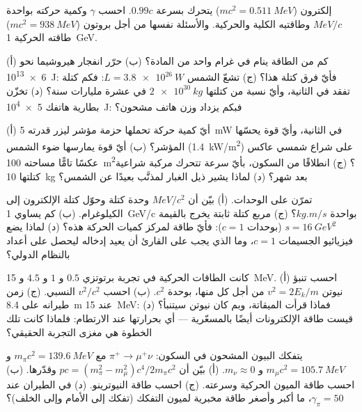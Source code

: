 \begin{exercise}[$\star$]\label{exo:b3:relativistic-dynamics:1}
إلكترون ($mc^2 = \qty{0.511}{MeV}$) يتحرك بسرعة $0.99c$. احسب
$\gamma$ وكمية حركته بواحدة $\unit{MeV}/c$ وطاقتيه الكلية
والحركية. والأسئلة نفسها من أجل بروتون ($mc^2 = \qty{938}{MeV}$)
طاقته الحركية \qty{1}{GeV}.
\end{exercise}

\begin{exercise}[$\star$]\label{exo:b3:relativistic-dynamics:2}
(أ) كم من الطاقة ينام في غرام واحد من المادة؟ (ب) حرّر انفجار
هيروشيما نحو \qty{6e13}{J}: فأيّ فرق كتلة هذا؟
(ج) تشعّ الشمس $L = \qty{3.8e26}{W}$: فكم كتلة تفقد
في الثانية، وأيّ نسبة من كتلتها $\qty{2e30}{kg}$ في عشرة
مليارات سنة؟ (د) تخزّن بطارية هاتفك \qty{5e4}{J}: فبكم
يزداد وزن هاتف مشحون؟
\end{exercise}

\begin{exercise}[$\star$]\label{exo:b3:relativistic-dynamics:3}
(أ) أيّ كمية حركة تحملها حزمة مؤشر ليزر قدرته \qty{5}{mW} في
الثانية، وأيّ قوة يحسّها المؤشر؟ (ب) أيّ قوة يمارسها
ضوء الشمس (\qty{1.4}{kW/m^2}) على شراع شمسي عاكس عكسًا تامًّا
مساحته \qty{100}{m^2}؟ (ج) انطلاقًا من السكون، بأيّ سرعة تتحرك
مركبة شراعية كتلتها \qty{10}{kg} بعد شهر؟ (د) لماذا يشير ذيل
الغبار لمذنَّب بعيدًا عن الشمس؟
\end{exercise}

\begin{exercise}[$\star$]\label{exo:b3:relativistic-dynamics:4}
تمرّن على الوحدات. (أ) بيّن أن $\unit{MeV}/c^2$ وحدة كتلة
وحوّل كتلة الإلكترون إلى الكيلوغرام. (ب) كم يساوي
\qty{1}{GeV/c} بواحدة $\unit{kg.m/s}$؟ (ج) مربع كتلة ثابتة
يخرج بالقيمة $s = \qty{16}{GeV^2}$ (بوحدات $c = 1$): فأيّ
طاقة لمركز كميات الحركة هذه؟ (د) لماذا يضع فيزيائيو الجسيمات
$c = 1$، وما الذي يجب على القارئ أن يعيد إدخاله ليحصل على أعداد بالنظام الدولي؟
\end{exercise}

\begin{exercise}[$\star\star$]\label{exo:b3:relativistic-dynamics:5}
كانت الطاقات الحركية في تجربة برتوتزي $0.5$ و $1$ و $4.5$ و
\qty{15}{MeV}. (أ) احسب تنبؤ نيوتن $v^2 = 2E_k/m$ من أجل
كل منها، بوحدة $c^2$. (ب) احسب $v^2/c^2$ النسبي. (ج)
زمن طيرانه على \qty{8.4}{m} عند \qty{15}{MeV}: فماذا قرأت
الميقاتة، وبم كان نيوتن سيتنبأ؟ (د) قيست طاقة الإلكترونات
أيضًا بالمسعّرية --- أي بحرارتها عند الارتطام: فلماذا كانت تلك
الخطوة هي مغزى التجربة الحقيقي؟
\end{exercise}

\begin{exercise}[$\star\star$]\label{exo:b3:relativistic-dynamics:6}
يتفكك البيون المشحون في السكون: $\pi^+ \to \mu^+\nu$ مع $m_\pi c^2 =
\qty{139.6}{MeV}$ و $m_\mu c^2 = \qty{105.7}{MeV}$ و $m_\nu \approx 0$.
(أ) بيّن أن $pc = (m_\pi^2 - m_\mu^2)c^4/2m_\pi c^2$ وقدّرها.
(ب) احسب طاقة الميون الحركية وسرعته. (ج) احسب طاقة النيوترينو.
(د) في الطيران عند $\gamma_\pi = 50$، ما أكبر وأصغر طاقة مخبرية
لميون التفكك (تفكك إلى الأمام وإلى الخلف)؟
\end{exercise}

